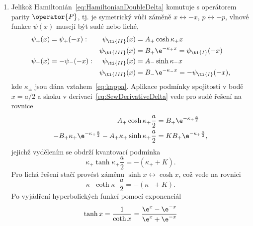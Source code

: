 \begin{solution}
	\begin{enumerate}
	\item
        Jelikož Hamiltonián~\eqref{eq:HamiltonianDoubleDelta} komutuje s operátorem parity $\operator{P}$, tj. je symetrický vůči záměně $x\leftrightarrow-x$, $p\leftrightarrow-p$, vlnové funkce $\psi(x)$ musejí být sudé nebo liché,        
		\begin{subequations}		
			\begin{align}
				\psi_{+}(x)&=\psi_{+}(-x): & \psi_{\ti{II}}(x)&=A_{+}\cosh{\kappa_{+} x}\\
					& &\psi_{\ti{III}}(x)&=B_{+}\e^{-\kappa_{+} x}=\psi_{\ti{I}}(-x)\\
				\psi_{-}(x)&=-\psi_{-}(-x): & \psi_{\ti{II}}(x)&=A_{-}\sinh{\kappa_{-} x}\\
					& &\psi_{\ti{III}}(x)&=B_{-}\e^{-\kappa_{-} x}=-\psi_{\ti{I}}(-x),
			\end{align}
		\end{subequations}
		kde $\kappa_{\pm}$ jsou dána vztahem~\eqref{eq:kappa}.
		Aplikace podmínky spojitosti v bodě $x=a/2$ a skoku v derivaci~\eqref{eq:SewDerivativeDelta} vede pro sudé řešení na rovnice
		\begin{subequations}
			\begin{align}
				A_{+}\cosh{\kappa_{+}\frac{a}{2}}
					&=B_{+}\e^{-\kappa_{+}\frac{a}{2}}\nonumber\\
				-B_{+}\kappa_{+}\e^{-\kappa_{+}\frac{a}{2}}-A_{+}\kappa_{+}\sinh{\kappa_{+}\frac{a}{2}}
					&=KB_{+}\e^{-\kappa_{+}\frac{a}{2}},
			\end{align}
			\label{eq:DoubleDeltaSewEven}
		\end{subequations}
		jejichž vydělením se obdrží kvantovací podmínka
		\begin{equation}\label{eq:DoubleDeltaEEven}
			\boxed{\kappa_{+}\tanh{\kappa_{+}\frac{a}{2}}
				=-\left(\kappa_{+}+K\right)}.
		\end{equation}
		Pro lichá řešení stačí provést záměnu $\sinh{x}\leftrightarrow\cosh{x}$, což vede na rovnici
		\begin{equation}\label{eq:DoubleDeltaEOdd}
            \boxed{\kappa_{-}\coth{\kappa_{-}\frac{a}{2}}
                =-\left(\kappa_{-}+K\right)}.
		\end{equation}
		Po vyjádření hyperbolických funkcí pomocí exponenciál
		\begin{equation}
            \tanh{x}
                =\frac{1}{\coth{x}}
                =\frac{\e^{x}-\e^{-x}}{\e^{x}+\e^{-x}}

\end{equation}
\end{enumerate}
\end{solution}
